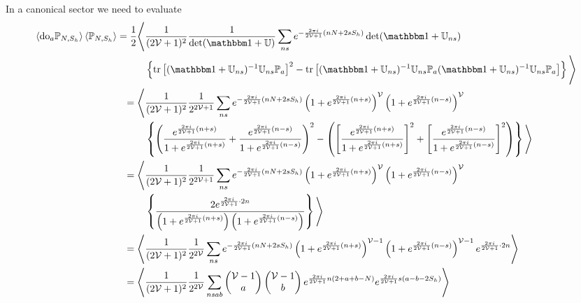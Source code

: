 In a canonical sector we need to evaluate
\begin{align}
    \expectation{ \doubleOccupancy_a \PP_{N,S_h}} \expectation{\PP_{N,S_h}}
    =
    \half \Bigg\langle &\oneover{(2\Volume+1)^2}\oneover{\det(\one+\UU)} \sum_{ns} e^{-\frac{2\pi i}{2\Volume+1}(nN+2sS_h)} \det(\one+\UU_{ns})
    \nonumber\\
    &\left\{\tr{(\one + \UU_{ns})\inverse \UU_{ns} \PP_a}^2 - \tr{(\one+\UU_{ns})\inverse \UU_{ns} \PP_a (\one+\UU_{ns})\inverse \UU_{ns} \PP_a}\right\} \Bigg\rangle
    \nonumber\\
    =\Bigg\langle & \oneover{(2\Volume+1)^2} \oneover{2^{2\Volume+1}} \sum_{ns} e^{-\frac{2\pi i}{2\Volume+1}(nN+2sS_h)} \left(1+e^{\frac{2\pi i}{2\Volume+1}(n+s)}\right)^\Volume \left(1+e^{\frac{2\pi i}{2\Volume+1}(n-s)}\right)^\Volume
    \nonumber\\
    &\left\{
        \left(
            \frac{e^{\frac{2\pi i}{2\Volume+1}(n+s)}}{1+e^{\frac{2\pi i}{2\Volume+1}(n+s)}}
          + \frac{e^{\frac{2\pi i}{2\Volume+1}(n-s)}}{1+e^{\frac{2\pi i}{2\Volume+1}(n-s)}}
        \right)^2
      - \left(
            \left[\frac{e^{\frac{2\pi i}{2\Volume+1}(n+s)}}{1+e^{\frac{2\pi i}{2\Volume+1}(n+s)}}\right]^2
          + \left[\frac{e^{\frac{2\pi i}{2\Volume+1}(n-s)}}{1+e^{\frac{2\pi i}{2\Volume+1}(n-s)}}\right]^2
        \right)
      \right\}
      \Bigg\rangle
    \nonumber\\
    =\Bigg\langle & \oneover{(2\Volume+1)^2} \oneover{2^{2\Volume+1}} \sum_{ns} e^{-\frac{2\pi i}{2\Volume+1}(nN+2sS_h)} \left(1+e^{\frac{2\pi i}{2\Volume+1}(n+s)}\right)^\Volume \left(1+e^{\frac{2\pi i}{2\Volume+1}(n-s)}\right)^\Volume
    \nonumber\\
    &\left\{
        \frac{2 e^{\frac{2\pi i}{2\Volume+1} \cdot 2n}}{
            \left(1+e^{\frac{2\pi i}{2\Volume+1}(n+s)}\right)
            \left(1+e^{\frac{2\pi i}{2\Volume+1}(n-s)}\right)
        }
      \right\}
      \Bigg\rangle
    \nonumber\\
    =\Bigg\langle & \oneover{(2\Volume+1)^2} \oneover{2^{2\Volume}} \sum_{ns} e^{-\frac{2\pi i}{2\Volume+1}(nN+2sS_h)} \left(1+e^{\frac{2\pi i}{2\Volume+1}(n+s)}\right)^{\Volume-1} \left(1+e^{\frac{2\pi i}{2\Volume+1}(n-s)}\right)^{\Volume-1} e^{\frac{2\pi i}{2\Volume+1} \cdot 2n} \Bigg\rangle
    \nonumber\\
    =\Bigg\langle & \oneover{(2\Volume+1)^2} \oneover{2^{2\Volume}} \sum_{nsab} \begin{pmatrix} \Volume-1 \\ a \end{pmatrix} \begin{pmatrix} \Volume-1 \\ b \end{pmatrix} e^{\frac{2\pi i}{2\Volume+1} n (2+a+b-N)} e^{\frac{2\pi i}{2\Volume+1} s (a-b-2S_h)} \Bigg\rangle

\end{align}
